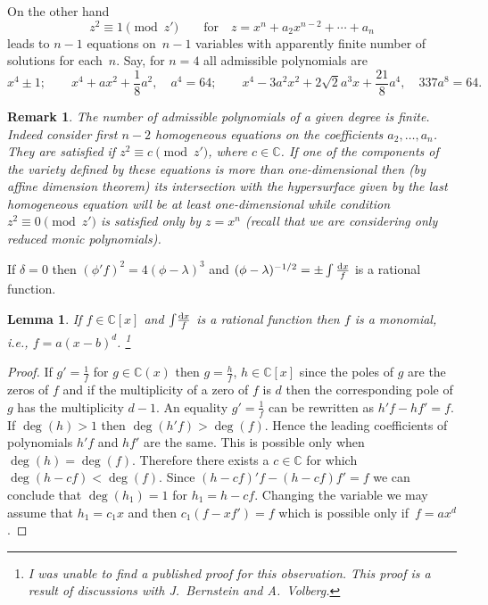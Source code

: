\documentclass[pdftex]{sigma}
\numberwithin{equation}{section}
\newtheorem{Lemma}[Theorem]{Lemma}
\newtheorem{Remark}[Theorem]{Remark} }
\newcommand{\C}{\mathbb C}
\newcommand{\la}{\lambda}
\begin{document}
On the other hand
\[
z^2 \equiv 1 \pmod {z'}\qquad\text{for}\quad
z = x^n + a_2x^{n-2} + \cdots + a_n
\]
leads to $n-1$ equations on~$n-1$ variables with apparently finite number of solutions for each~$n$. Say, for $n = 4$ all admissible polynomials are
\[
x^4 \pm 1; \qquad
x^4 + ax^2 + \frac{1}{8}a^2, \quad
a^4 = 64; \qquad
x^4 - 3a^2x^2 + 2\sqrt{2}a^3x + \frac{21}{8}a^4,\quad
337a^8 = 64.
\]

\begin{Remark}\label{corres}
The number of admissible polynomials of a given degree is finite. Indeed consider first $n-2$ homogeneous equations on the coefficients $a_2, \dots, a_n$. They are satisfied if $z^2 \equiv c \pmod{z'}$, where $c \in \C$. If one of the components of the variety defined by these equations is more than one-dimensional then (by affine dimension theorem) its intersection with the hypersurface given by the last homogeneous equation will be at least one-dimensional while condition \mbox{$z^2 \equiv 0 \pmod{z'}$} is satisfied only by $z = x^n$ (recall that we are considering only reduced monic polynomials).
\end{Remark}

If $\delta = 0$ then $(\phi'f)^2 = 4(\phi - \la)^3$ and $(\phi - \la)^{-1/2} = \pm\int \frac{{\rm d} x}{f}$ is a rational function.

\begin{Lemma}\label{div-3}%
If $f\!\in\!\C[x]$ and $\int\! \frac{{\rm d} x}{f}$ is a rational function then $f$ is a monomial, i.e., $f\! = a(x \!- b)^d$.%
\footnote{I was unable to find a published proof for this observation. This proof is a result of discussions with J.~Bernstein and A.~Volberg.}
\end{Lemma}

\begin{proof}
If $g' = \frac{1}{f}$ for $g \in \C(x)$ then $g = \frac{h}{f}$, $h \in \C[x]$ since the poles of $g$ are the zeros of $f$ and if the multiplicity of a zero of $f$ is $d$ then the corresponding pole of $g$ has the multiplicity $d - 1$. An equality $g' = \frac{1}{f}$ can be rewritten as $h'f - hf' = f$. If $\deg(h) > 1$ then $\deg(h'f) > \deg(f)$. Hence the leading coefficients of polynomials $h'f$ and $hf'$ are the same. This is possible only when $\deg(h) = \deg(f)$. Therefore there exists a $c \in \C$ for which $\deg(h - cf) < \deg(f)$. Since $(h - cf)'f - (h - cf)f' = f$ we can conclude that $\deg(h_1) = 1$ for $h_1 = h - cf$. Changing the variable we may assume that $h_1 = c_1x$ and then $c_1(f - xf') = f$ which is possible only if~$f = ax^d$.
\end{proof}
\end{document}
